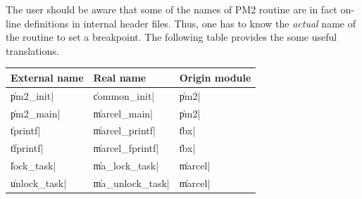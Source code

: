 The user should be aware that some of the names of PM2 routine are in
fact on-line definitions in internal header files. Thus, one has to
know the \emph{actual} name of the routine to set a breakpoint. The
following table provides the some useful translations.
\begin{center}
\begin{tabular}{|l|l|l|}
\hline
External name & Real name & Origin module \\
\hline
\|pm2_init|     & \|common_init|        & \|pm2| \\
\|pm2_main|     & \|marcel_main|        & \|pm2| \\
\hline
\|tprintf|      & \|marcel_printf|      & \|tbx| \\
\|tfprintf|     & \|marcel_fprintf|     & \|tbx| \\
\hline
\|lock_task|    & \|ma_lock_task|       & \|marcel| \\
\|unlock_task|  & \|ma_unlock_task|     & \|marcel| \\
\hline
\end{tabular}
\end{center}


